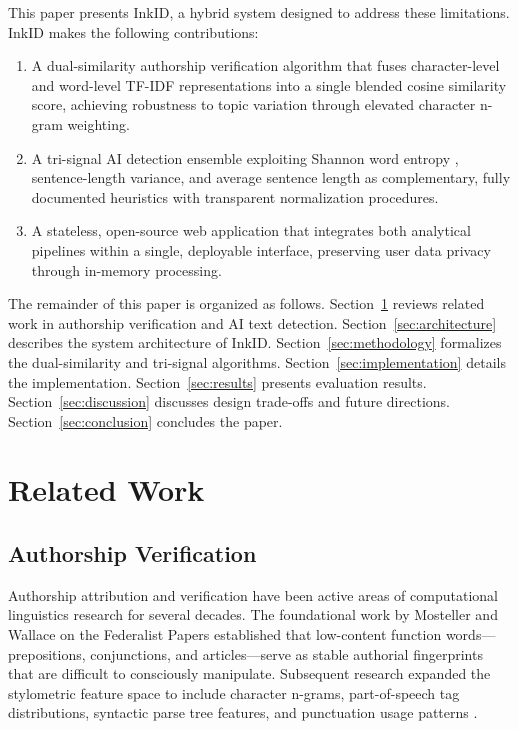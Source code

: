 \documentclass[conference]{IEEEtran}
\begin{document}
This paper presents InkID, a hybrid system designed to address these
limitations. InkID makes the following contributions:
\begin{enumerate}
  \item A dual-similarity authorship verification algorithm that fuses
    character-level and word-level TF-IDF representations \cite{salton1988tfidf}
    into a single blended cosine similarity score, achieving robustness to
    topic variation through elevated character n-gram weighting.
  \item A tri-signal AI detection ensemble exploiting Shannon word entropy
    \cite{shannon1948entropy}, sentence-length variance, and average sentence
    length as complementary, fully documented heuristics with transparent
    normalization procedures.
  \item A stateless, open-source web application that integrates both
    analytical pipelines within a single, deployable interface, preserving
    user data privacy through in-memory processing.
\end{enumerate}

The remainder of this paper is organized as follows. Section~\ref{sec:related}
reviews related work in authorship verification and AI text detection.
Section~\ref{sec:architecture} describes the system architecture of InkID.
Section~\ref{sec:methodology} formalizes the dual-similarity and tri-signal
algorithms. Section~\ref{sec:implementation} details the implementation.
Section~\ref{sec:results} presents evaluation results.
Section~\ref{sec:discussion} discusses design trade-offs and future directions.
Section~\ref{sec:conclusion} concludes the paper.

\section{Related Work}
\label{sec:related}

\subsection{Authorship Verification}

Authorship attribution and verification have been active areas of computational
linguistics research for several decades. The foundational work by Mosteller
and Wallace \cite{mosteller1963inference} on the Federalist Papers established
that low-content function words—prepositions, conjunctions, and articles—serve
as stable authorial fingerprints that are difficult to consciously manipulate.
Subsequent research expanded the stylometric feature space to include character
n-grams, part-of-speech tag distributions, syntactic parse tree features, and
punctuation usage patterns \cite{stamatatos2009survey}.
\end{document}
